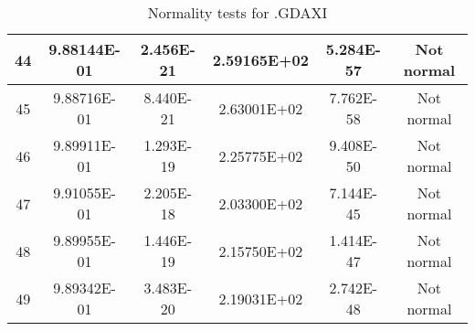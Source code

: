 \begin{table}[h]
\begin{tabular}{|c|c|c|c|c|c|}
		44 & 9.88144E-01 & 2.456E-21 & 2.59165E+02 & 5.284E-57 & Not normal\\\hline
		45 & 9.88716E-01 & 8.440E-21 & 2.63001E+02 & 7.762E-58 & Not normal\\\hline
		46 & 9.89911E-01 & 1.293E-19 & 2.25775E+02 & 9.408E-50 & Not normal\\\hline
		47 & 9.91055E-01 & 2.205E-18 & 2.03300E+02 & 7.144E-45 & Not normal\\\hline
		48 & 9.89955E-01 & 1.446E-19 & 2.15750E+02 & 1.414E-47 & Not normal\\\hline
		49 & 9.89342E-01 & 3.483E-20 & 2.19031E+02 & 2.742E-48 & Not normal\\\hline
	\end{tabular}
	\caption{Normality tests for .GDAXI}
\end{table}
